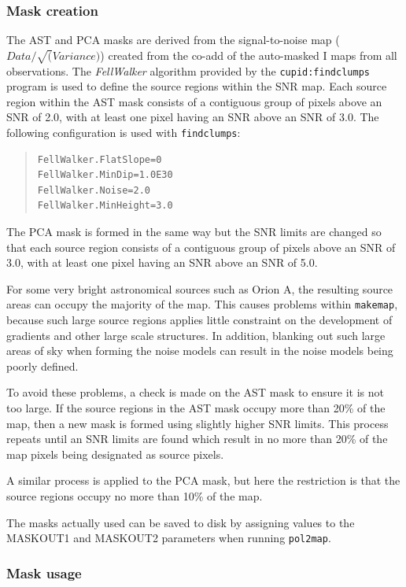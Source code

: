 \documentclass[twoside,11pt]{starlink}
\begin{document}
\subsubsection{Mask creation}
The AST and PCA masks are derived from the signal-to-noise map
($Data/\sqrt(Variance)$) created from the co-add of the auto-masked I
maps from all observations.  The \emph{FellWalker} algorithm provided by the
\texttt{cupid:findclumps} program is used to define the source regions within
the SNR map. Each source region within the AST mask consists of a contiguous
group of pixels above an SNR of 2.0, with at least one pixel having an SNR
above an SNR of 3.0. The following configuration is used with
\texttt{findclumps}:

\begin{quote}
\begin{verbatim}
FellWalker.FlatSlope=0
FellWalker.MinDip=1.0E30
FellWalker.Noise=2.0
FellWalker.MinHeight=3.0
\end{verbatim}
\end{quote}

The PCA mask is formed in the same way but the SNR limits are changed so
that each source region consists of a contiguous group of pixels above an
SNR of 3.0, with at least one pixel having an SNR above an SNR of 5.0.

For some very bright astronomical sources such as Orion A, the resulting
source areas can occupy the majority of the map. This causes problems
within \texttt{makemap}, because such large source regions applies little
constraint on the development of gradients and other large scale
structures. In addition, blanking out such large areas of sky when
forming the noise models can result in the noise models being poorly
defined.

To avoid these problems, a check is made on the AST mask to ensure it is
not too large. If the source regions in the AST mask occupy more than
20\% of the map, then a new mask is formed using slightly higher SNR
limits. This process repeats until an SNR limits are found which result
in no more than 20\% of the map pixels being designated as source pixels.

A similar process is applied to the PCA mask, but here the restriction is
that the source regions occupy no more than 10\% of the map.

The masks actually used can be saved to disk by assigning values to the
MASKOUT1 and MASKOUT2 parameters when running \texttt{pol2map}.

\subsubsection{Mask usage}
\end{document}
